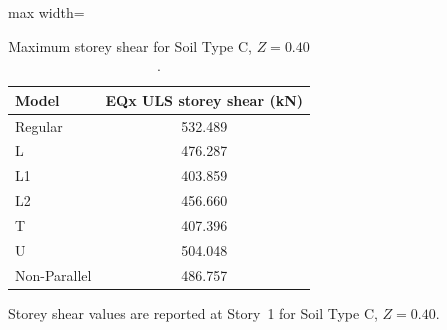 
\begin{table}[!htb]
\centering
\caption{Maximum storey shear for Soil Type C, $Z=0.40$.}
\label{tab:storey_shear_summary_cp112}
\normalsize
\begin{adjustbox}{max width=\linewidth}
\begin{tabular}{@{}lc@{}}
\toprule
Model & EQx ULS storey shear (kN) \\
\midrule
Regular & 532.489 \\
L & 476.287 \\
L1 & 403.859 \\
L2 & 456.660 \\
T & 407.396 \\
U & 504.048 \\
Non-Parallel & 486.757 \\
\bottomrule
\end{tabular}
\end{adjustbox}
\par\smallskip
\begin{minipage}{0.97\textwidth}\normalsize
Storey shear values are reported at Story~1 for Soil Type C, $Z=0.40$.
\end{minipage}
\end{table}
